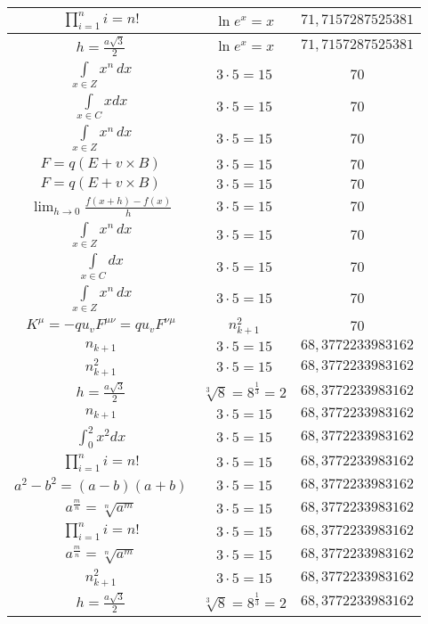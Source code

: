 \documentclass{article}
\begin{document}
\begin{flushleft}
\begin{longtable}{|c|c|c|}
$\prod_{i=1}^ni=n!$ & $\ln e^x=x$ & $71,7157287525381$ \\ \hline 
$h=\frac{a\sqrt{3}}{2}$ & $\ln e^x=x$ & $71,7157287525381$ \\ \hline 
$\int \limits_{x\in Z}\!x^{n}\,dx$ & $3\cdot 5=15$ & $70$ \\ \hline 
$\int \limits_{x\in C}xdx$ & $3\cdot 5=15$ & $70$ \\ \hline 
$\int \limits_{x\in Z}\!x^{n}\,dx$ & $3\cdot 5=15$ & $70$ \\ \hline 
$F=q\left(E+v\times B\right)$ & $3\cdot 5=15$ & $70$ \\ \hline 
$F=q\left(E+v\times B\right)$ & $3\cdot 5=15$ & $70$ \\ \hline 
$\lim_{h\to0}\frac{f(x+h)-f(x)}{h}$ & $3\cdot 5=15$ & $70$ \\ \hline 
$\int \limits_{x\in Z}\!x^{n}\,dx$ & $3\cdot 5=15$ & $70$ \\ \hline 
$\int \limits_{x\in C}dx$ & $3\cdot 5=15$ & $70$ \\ \hline 
$\int \limits_{x\in Z}\!x^{n}\,dx$ & $3\cdot 5=15$ & $70$ \\ \hline 
$K^\mu=-qu_vF^{\mu\nu}=qu_vF^{\nu\mu}$ & $n_{k+1}^2$ & $70$ \\ \hline 
$n_{k+1}$ & $3\cdot 5=15$ & $68,3772233983162$ \\ \hline 
$n_{k+1}^2$ & $3\cdot 5=15$ & $68,3772233983162$ \\ \hline 
$h=\frac{a\sqrt{3}}{2}$ & $\sqrt[3]{8}=8^{\frac{1}{3}}=2$ & $68,3772233983162$ \\ \hline 
$n_{k+1}$ & $3\cdot 5=15$ & $68,3772233983162$ \\ \hline 
$\int _0^2x^2dx$ & $3\cdot 5=15$ & $68,3772233983162$ \\ \hline 
$\prod_{i=1}^ni=n!$ & $3\cdot 5=15$ & $68,3772233983162$ \\ \hline 
$a^2-b^2=(a-b)(a+b)$ & $3\cdot 5=15$ & $68,3772233983162$ \\ \hline 
$a^{\frac{m}{n}}=\sqrt[n]{a^{m}}$ & $3\cdot 5=15$ & $68,3772233983162$ \\ \hline 
$\prod_{i=1}^ni=n!$ & $3\cdot 5=15$ & $68,3772233983162$ \\ \hline 
$a^{\frac{m}{n}}=\sqrt[n]{a^{m}}$ & $3\cdot 5=15$ & $68,3772233983162$ \\ \hline 
$n_{k+1}^2$ & $3\cdot 5=15$ & $68,3772233983162$ \\ \hline 
$h=\frac{a\sqrt{3}}{2}$ & $\sqrt[3]{8}=8^{\frac{1}{3}}=2$ & $68,3772233983162$ \\ \hline 

\end{longtable}
\end{flushleft}
\end{document}

